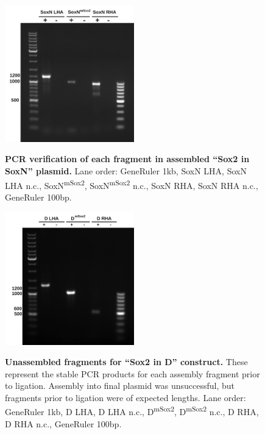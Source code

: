 \documentclass[withindex,glossary]{cam-thesis}
\begin{document}
\setcounter{figure}{6-1}
\begin{figure}[htbp]
\centering
\includegraphics[width=0.5\textwidth]{Fig6_Jan30-SoxN_Assembly.png}
\label{fig6}
\caption{\textbf{PCR verification of each fragment in assembled ``Sox2 in SoxN'' plasmid.} Lane order: GeneRuler 1kb, SoxN LHA, SoxN LHA n.c., SoxN\textsuperscript{mSox2}, SoxN\textsuperscript{mSox2} n.c., SoxN RHA, SoxN RHA n.c., GeneRuler 100bp.}
\end{figure}

\setcounter{figure}{7-1}
\begin{figure}[htbp]
\centering
\includegraphics[width=0.5\textwidth]{Fig7_Mar04-D unassembled frags.png}
\label{fig7}
\caption{\textbf{Unassembled fragments for ``Sox2 in D'' construct.} These represent the stable PCR products for each  assembly fragment prior to ligation. Assembly into final plasmid was unsuccessful, but fragments prior to ligation were of expected lengths. Lane order: GeneRuler 1kb, D LHA, D LHA n.c., D\textsuperscript{mSox2}, D\textsuperscript{mSox2} n.c., D RHA, D RHA n.c., GeneRuler 100bp.}
\end{figure}
\end{document}
